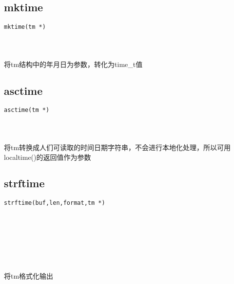 \documentclass[10pt,a4paper]{article}
\begin{document}
\subsection{mktime}
\begin{spacing}{2.0}
\lstset{language=C,numbers=none}
\begin{lstlisting}
mktime(tm *)
\end{lstlisting}
{\large\color[rgb]{0.2,0.4,0.6}{*:}}
\paragraph{ \ \ }将tm结构中的年月日为参数，转化为time\_t值
\end{spacing}

\subsection{asctime}
\begin{spacing}{2.0}
\lstset{language=C,numbers=none}
\begin{lstlisting}
asctime(tm *)
\end{lstlisting}
{\large\color[rgb]{0.2,0.4,0.6}{*:}}
\paragraph{ \ \ }将tm转换成人们可读取的时间日期字符串，不会进行本地化处理，所以可用localtime()的返回值作为参数
\end{spacing}

\subsection{strftime}
\begin{spacing}{2.0}
\lstset{language=C,numbers=none}
\begin{lstlisting}
strftime(buf,len,format,tm *)
\end{lstlisting}
{\large\color[rgb]{0.2,0.4,0.6}{buf:}} \\
{\large\color[rgb]{0.2,0.4,0.6}{len:}} \\
{\large\color[rgb]{0.2,0.4,0.6}{format:}} \\
{\large\color[rgb]{0.2,0.4,0.6}{*:}}
\paragraph{ \ \ }将tm格式化输出
\end{spacing}
\end{document}
